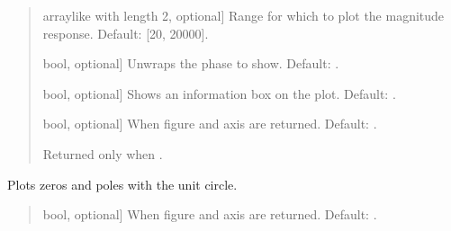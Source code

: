 \documentclass[letterpaper,10pt,english]{sphinxmanual}
\begin{document}
\begin{fulllineitems}
\begin{fulllineitems}
\begin{quote}
\begin{description}
\begin{description}
\sphinxlineitem{\sphinxstylestrong{range\_hz}}{[}array\sphinxhyphen{}like with length 2, optional{]}
\sphinxAtStartPar
Range for which to plot the magnitude response.
Default: {[}20, 20000{]}.

\sphinxlineitem{\sphinxstylestrong{unwrap}}{[}bool, optional{]}
\sphinxAtStartPar
Unwraps the phase to show. Default: .

\sphinxlineitem{\sphinxstylestrong{show\_info\_box}}{[}bool, optional{]}
\sphinxAtStartPar
Shows an information box on the plot. Default: .

\sphinxlineitem{\sphinxstylestrong{returns}}{[}bool, optional{]}
\sphinxAtStartPar
When  figure and axis are returned. Default: .

\end{description}

\begin{description}
\sphinxAtStartPar
Returned only when .

\end{description}

\end{description}\end{quote}

\end{fulllineitems}


\begin{fulllineitems}
\label{\detokenize{classes:dsptoolbox.classes.filter_class.Filter.plot_zp}}
\pysigstartsignatures
{}
\pysigstopsignatures
\sphinxAtStartPar
Plots zeros and poles with the unit circle.
\begin{quote}\begin{description}
\begin{description}
\sphinxlineitem{\sphinxstylestrong{returns}}{[}bool, optional{]}
\sphinxAtStartPar
When  figure and axis are returned. Default: .


\end{description}
\end{description}
\end{quote}
\end{fulllineitems}
\end{fulllineitems}
\end{document}
